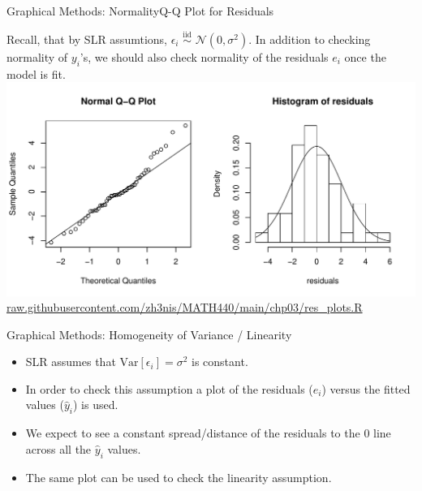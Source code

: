 \documentclass{beamer}
\newcommand{\Var}{\mathrm{Var}}
\begin{document}
\begin{frame}{Graphical Methods: Normality}{Q-Q Plot for Residuals}

Recall, that by SLR assumtions, $\epsilon_i\,\,{\stackrel{\text{iid}}{\sim}}\,\,\mathcal{N}(0,\sigma^2)$. \pause In addition to checking normality of $y_i$'s, we should also check normality of the residuals $e_i$ once the model is fit.
\pause
\includegraphics[width=\textwidth]{plots/res_qq_hist.pdf}\\
\footnotesize{\color{blue}\url{raw.githubusercontent.com/zh3nis/MATH440/main/chp03/res_plots.R}}
\end{frame}


\begin{frame}{Graphical Methods: Homogeneity of Variance / Linearity}
\begin{itemize}
    \item SLR assumes that $\Var[\epsilon_i]=\sigma^2$ is constant.
    \item<2->In order to check this assumption a plot of the residuals ($e_i$) versus the fitted values ($\hat{y}_i$) is used.
    \item<3->We expect to see a constant spread/distance of the residuals to the 0 line across all the $\hat{y}_i$ values.
    
    \item<5->The same plot can be used to check the linearity assumption. 
\end{itemize}
\end{frame}
\end{document}
